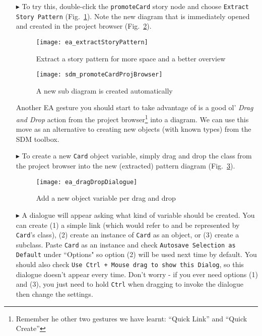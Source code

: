 \begin{itemize}
\vspace{0.5cm}

\item[$\blacktriangleright$] To try this, double-click the \texttt{promoteCard} story node and choose \texttt{Extract Story Pattern}
(Fig.~\ref{fig:sdm_check_extract_storypattern}). Note the new diagram that is immediately opened and created in the project browser
(Fig.~\ref{fig:sdm_new_sub_diagram}).

\begin{figure}[htbp]
\begin{center}
  \texttt{[image: ea\_extractStoryPattern]}
  \caption{Extract a story pattern for more space and a better overview}
  \label{fig:sdm_check_extract_storypattern}
\end{center}
\end{figure}

\begin{figure}[htbp]
\begin{center}
  \texttt{[image: sdm\_promoteCardProjBrowser]}
  \caption{A new sub diagram is created automatically}
  \label{fig:sdm_new_sub_diagram}
\end{center}
\end{figure}

\newpage

Another EA gesture you should start to take advantage of is a good ol' \emph{Drag and Drop} action from the project browser\footnote{Remember he other two
gestures we have learnt: ``Quick Link'' and ``Quick Create''} into a diagram. We can use this move as an alternative to creating new objects (with known types) from the SDM
toolbox.

\vspace{0.5cm}

\item[$\blacktriangleright$] To create a new \texttt{Card} object variable, simply drag and drop the class from the project browser into the new (extracted)
pattern diagram (Fig.~\ref{fig:sdm_check_bound_card}).

\begin{figure}[htbp]
\begin{center}
  \texttt{[image: ea\_dragDropDialogue]}
  \caption{Add a new object variable per drag and drop}
  \label{fig:sdm_check_bound_card}
\end{center}
\end{figure}

\item[$\blacktriangleright$] A dialogue will appear asking what kind of variable should be created. You can create (1) a simple link (which would
refer to and be represented by \texttt{Card}'s class), (2) create an instance of \texttt{Card} as an object, or (3) create a subclass. Paste \texttt{Card} as an
instance and check \texttt{Autosave Selection as Default} under ``Options" so option (2) will be used next time by default. You should also check \texttt{Use
Ctrl + Mouse drag to show this Dialog}, so this dialogue doesn't appear every time. Don't worry - if you ever need options (1) and (3), you  just need to hold
\texttt{Ctrl} when dragging to invoke the dialogue then change the settings.


\end{itemize}
